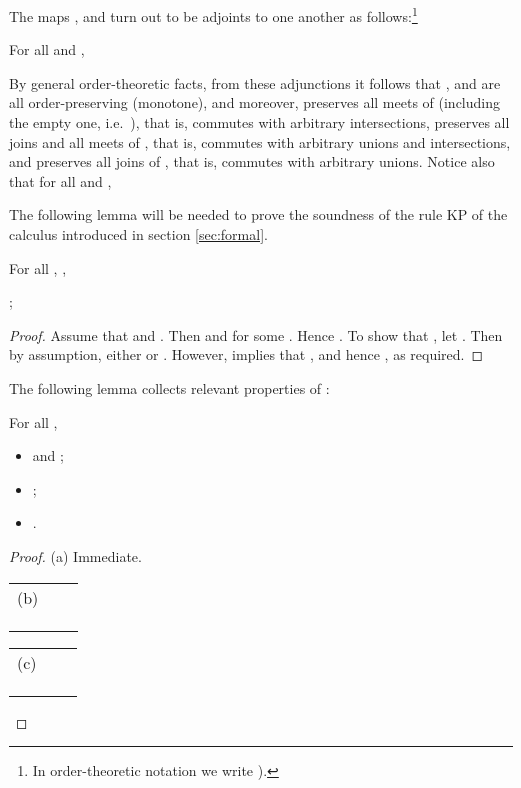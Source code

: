The maps ,  and  turn out to be adjoints to one another as follows:\footnote{In order-theoretic notation we write  ).}

\begin{lemma}
\label{lemma: bh left adjoint of hb}
For all  and ,

\end{lemma}
By general order-theoretic facts, from these adjunctions it follows that ,  and  are all order-preserving (monotone), and moreover,  preserves all meets of  (including the empty one, i.e.\ ), that is,  commutes with arbitrary intersections,  preserves all joins and all meets of , that is,  commutes with arbitrary unions and intersections, and  preserves all joins  of , that is,  commutes with arbitrary unions.
Notice also that  for all  and ,


The following lemma  will be needed to prove the soundness of the rule KP of the calculus introduced in section \ref{sec:formal}.

\begin{lemma}
\label{lemma: soundness of rules}
For all , ,
\begin{center} \label{lem:sem:item2}
;
\end{center}
\end{lemma}
\begin{proof}
Assume that  and . Then  and  for some . Hence . To show that , let . Then by assumption, either   or . However,  implies that , and hence , as required.
\end{proof}










The following lemma collects  relevant  properties of :
\begin{lemma}
\label{lemma:properties of bh}
For all ,
\begin{itemize}
\item[(a)]   and ;
\item[(b)] ;
\item[(c)] .
\end{itemize}
\end{lemma}


 \begin{proof}
(a) Immediate.\\

\noindent 
\begin{tabular}{r c l}
(b)  &&\\
&&\\
&&\\
&&\\
\end{tabular}



\noindent 
\begin{tabular}{r c l}
(c)  &&\\
&&\\
&&\\
&&
\end{tabular}
\end{proof}


